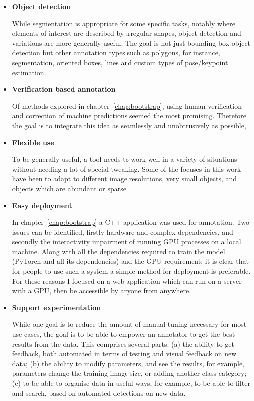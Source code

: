 \begin{itemize}

\item {\bf Object detection} \par
While segmentation is appropriate for some specific tasks, notably where elements of interest are described by irregular shapes, object detection and variations are more generally useful. The goal is not just bounding box object detection but other annotation types such as polygons, for instance, segmentation, oriented boxes, lines and custom types of pose/keypoint estimation.

\item {\bf Verification based annotation} \par
Of methods explored in chapter~\ref{chap:bootstrap}, using human verification and correction of machine predictions seemed the most promising. Therefore the goal is to integrate this idea as seamlessly and unobtrusively as possible, 

\item {\bf Flexible use} \par
To be generally useful, a tool needs to work well in a variety of situations without needing a lot of special tweaking. Some of the focuses in this work have been to adapt to different image resolutions, very small objects, and objects which are abundant or sparse. 

\item {\bf Easy deployment} \par
In chapter~\ref{chap:bootstrap} a C++ application was used for annotation. Two issues can be identified, firstly hardware and complex dependencies, and secondly the interactivity impairment of running GPU processes on a local machine. Along with all the dependencies required to train the model (PyTorch \cite{Paszke2017} and all its dependencies) and the \gls{GPU} requirement; it is clear that for people to use such a system a simple method for deployment is preferable. For these reasons I focused on a web application which can run on a server with a GPU, then be accessible by anyone from anywhere.

\item {\bf Support experimentation} \par
While one goal is to reduce the amount of manual tuning necessary for most use cases, the goal is to be able to empower an annotator to get the best results from the data. This comprises  several parts: (a) the ability to get feedback, both automated in terms of testing and visual feedback on new data; (b) the ability to modify parameters, and see the results, for example, parameters change the training image size, or adding another class category; (c) to be able to organise data in useful ways, for example, to be able to filter and search, based on automated detections on new data.

\end{itemize}


